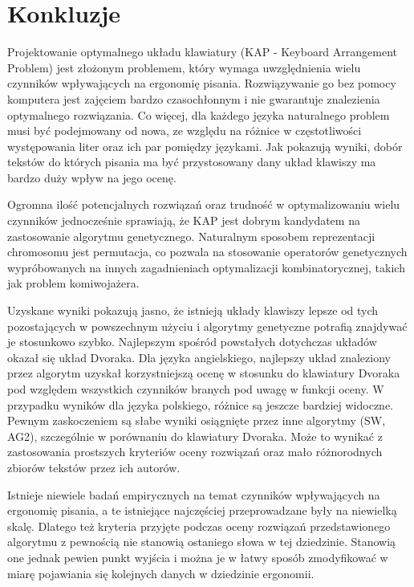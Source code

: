 \documentclass{xmgr}
\begin{document}
\summary

\section{Konkluzje}

Projektowanie optymalnego układu klawiatury (KAP - Keyboard Arrangement Problem) jest złożonym problemem, który wymaga uwzględnienia wielu czynników wpływających na ergonomię pisania. Rozwiązywanie go bez pomocy komputera jest zajęciem bardzo czasochłonnym i nie gwarantuje znalezienia optymalnego rozwiązania. Co więcej, dla każdego języka naturalnego problem musi być podejmowany od nowa, ze względu na różnice w częstotliwości występowania liter oraz ich par pomiędzy językami. Jak pokazują wyniki, dobór tekstów do których pisania ma być przystosowany dany układ klawiszy ma bardzo duży wpływ na jego ocenę.

Ogromna ilość potencjalnych rozwiązań oraz trudność w optymalizowaniu wielu czynników jednocześnie sprawiają, że KAP jest dobrym kandydatem na zastosowanie algorytmu genetycznego. Naturalnym sposobem reprezentacji chromosomu jest permutacja, co pozwala na stosowanie operatorów genetycznych wypróbowanych na innych zagadnieniach optymalizacji kombinatorycznej, takich jak problem komiwojażera.

Uzyskane wyniki pokazują jasno, że istnieją układy klawiszy lepsze od tych pozostających w powszechnym użyciu i algorytmy genetyczne potrafią znajdywać je stosunkowo szybko. Najlepszym spośród powstałych dotychczas układów okazał się układ Dvoraka. Dla języka angielskiego, najlepszy układ znaleziony przez algorytm uzyskał korzystniejszą ocenę w stosunku do klawiatury Dvoraka pod względem wszystkich czynników branych pod uwagę w funkcji oceny. W przypadku wyników dla języka polskiego, różnice są jeszcze bardziej widoczne. Pewnym zaskoczeniem są słabe wyniki osiągnięte przez inne algorytmy (SW, AG2), szczególnie w porównaniu do klawiatury Dvoraka. Może to wynikać z zastosowania prostszych kryteriów oceny rozwiązań oraz mało różnorodnych zbiorów tekstów przez ich autorów.

Istnieje niewiele badań empirycznych na temat czynników wpływających na ergonomię pisania, a te istniejące najczęściej przeprowadzane były na niewielką skalę. Dlatego też kryteria przyjęte podczas oceny rozwiązań przedstawionego algorytmu z pewnością nie stanowią ostaniego słowa w tej dziedzinie. Stanowią one jednak pewien punkt wyjścia i można je w łatwy sposób zmodyfikować w miarę pojawiania się kolejnych danych w dziedzinie ergonomii.
\end{document}
